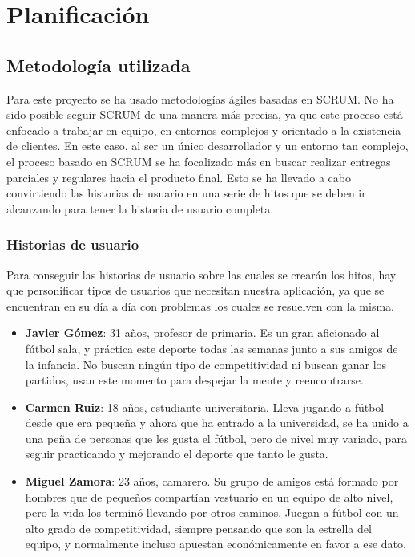 \chapter{Planificación}

\section{Metodología utilizada}

Para este proyecto se ha usado metodologías ágiles basadas en SCRUM. No ha sido posible seguir SCRUM de una manera más precisa, ya que este proceso está enfocado a trabajar en
equipo, en entornos complejos y orientado a la existencia de clientes. En este caso, al ser un único desarrollador y un entorno tan complejo, el proceso basado en SCRUM se ha
focalizado más en buscar realizar entregas parciales y regulares hacia el producto final. Esto se ha llevado a cabo convirtiendo las historias de usuario en una serie de hitos
que se deben ir alcanzando para tener la historia de usuario completa.\\

\subsection{Historias de usuario}

Para conseguir las historias de usuario sobre las cuales se crearán los hitos, hay que personificar tipos de usuarios que necesitan nuestra aplicación, ya que se encuentran en su día a día
con problemas los cuales se resuelven con la misma.

\newpage

\begin{itemize}
    \item \textbf{Javier Gómez}: 31 años, profesor de primaria. Es un gran aficionado al fútbol sala, y práctica este deporte todas las semanas junto a sus amigos de la infancia. No buscan ningún tipo de competitividad ni buscan ganar los partidos, usan este momento para despejar la mente y reencontrarse.
    \item \textbf{Carmen Ruiz}: 18 años, estudiante universitaria. Lleva jugando a fútbol desde que era pequeña y ahora que ha entrado a la universidad, se ha unido a una peña de personas que les gusta el fútbol, pero de nivel muy variado, para seguir practicando y mejorando el deporte que tanto le gusta.
    \item \textbf{Miguel Zamora}: 23 años, camarero. Su grupo de amigos está formado por hombres que de pequeños compartían vestuario en un equipo de alto nivel, pero la vida los terminó llevando por otros caminos. Juegan a fútbol con un alto grado de competitividad, siempre pensando que son la estrella del equipo, y normalmente incluso apuestan económicamente en favor a ese dato.
\end{itemize}

